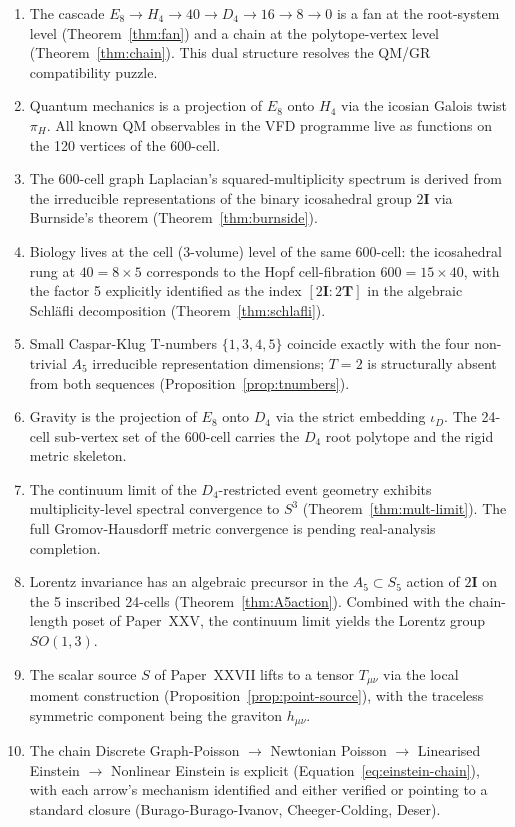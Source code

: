 \documentclass[12pt]{article}
\newcommand{\twoT}{2\mathbf{T}}
\newcommand{\twoI}{2\mathbf{I}}
\begin{document}
\begin{enumerate}
    \item The cascade $E_8 \to H_4 \to 40 \to D_4 \to 16 \to 8 \to 0$ is a fan at the root-system level (Theorem~\ref{thm:fan}) and a chain at the polytope-vertex level (Theorem~\ref{thm:chain}). This dual structure resolves the QM/GR compatibility puzzle.
    \item Quantum mechanics is a projection of $E_8$ onto $H_4$ via the icosian Galois twist $\pi_H$. All known QM observables in the VFD programme live as functions on the 120 vertices of the 600-cell.
    \item The 600-cell graph Laplacian's squared-multiplicity spectrum is derived from the irreducible representations of the binary icosahedral group $\twoI$ via Burnside's theorem (Theorem~\ref{thm:burnside}).
    \item Biology lives at the cell (3-volume) level of the same 600-cell: the icosahedral rung at $40 = 8 \times 5$ corresponds to the Hopf cell-fibration $600 = 15 \times 40$, with the factor 5 explicitly identified as the index $[\twoI : \twoT]$ in the algebraic Schl\"afli decomposition (Theorem~\ref{thm:schlafli}).
    \item Small Caspar-Klug T-numbers $\{1, 3, 4, 5\}$ coincide exactly with the four non-trivial $A_5$ irreducible representation dimensions; $T = 2$ is structurally absent from both sequences (Proposition~\ref{prop:tnumbers}).
    \item Gravity is the projection of $E_8$ onto $D_4$ via the strict embedding $\iota_D$. The 24-cell sub-vertex set of the 600-cell carries the $D_4$ root polytope and the rigid metric skeleton.
    \item The continuum limit of the $D_4$-restricted event geometry exhibits multiplicity-level spectral convergence to $S^3$ (Theorem~\ref{thm:mult-limit}). The full Gromov-Hausdorff metric convergence is pending real-analysis completion.
    \item Lorentz invariance has an algebraic precursor in the $A_5 \subset S_5$ action of $\twoI$ on the 5 inscribed 24-cells (Theorem~\ref{thm:A5action}). Combined with the chain-length poset of Paper~XXV, the continuum limit yields the Lorentz group $SO(1,3)$.
    \item The scalar source $S$ of Paper~XXVII lifts to a tensor $T_{\mu\nu}$ via the local moment construction (Proposition~\ref{prop:point-source}), with the traceless symmetric component being the graviton $h_{\mu\nu}$.
    \item The chain Discrete Graph-Poisson $\to$ Newtonian Poisson $\to$ Linearised Einstein $\to$ Nonlinear Einstein is explicit (Equation~\ref{eq:einstein-chain}), with each arrow's mechanism identified and either verified or pointing to a standard closure (Burago-Burago-Ivanov, Cheeger-Colding, Deser).

\end{enumerate}
\end{document}
